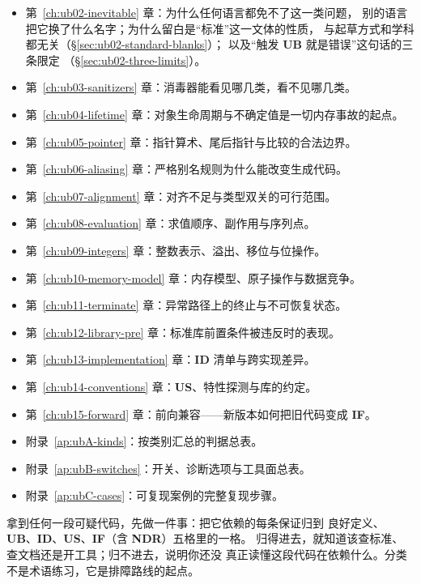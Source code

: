 \documentclass[12pt,a4paper,fontset=fandol]{ctexbook}
\newcommand{\UB}{\textbf{\textsf{UB}}}
\newcommand{\IDB}{\textbf{\textsf{ID}}}
\newcommand{\USB}{\textbf{\textsf{US}}}
\newcommand{\NDR}{\textbf{\textsf{NDR}}}
\newcommand{\ILLF}{\textbf{\textsf{IF}}}
\begin{document}
\begin{itemize}
  \item 第~\ref{ch:ub02-inevitable} 章：为什么任何语言都免不了这一类问题，
        别的语言把它换了什么名字；为什么留白是“标准”这一文体的性质，
        与起草方式和学科都无关（\S\ref{sec:ub02-standard-blanks}）；
        以及“触发 \UB{} 就是错误”这句话的三条限定
        （\S\ref{sec:ub02-three-limits}）。
  \item 第~\ref{ch:ub03-sanitizers} 章：消毒器能看见哪几类，看不见哪几类。
  \item 第~\ref{ch:ub04-lifetime} 章：对象生命周期与不确定值是一切内存事故的起点。
  \item 第~\ref{ch:ub05-pointer} 章：指针算术、尾后指针与比较的合法边界。
  \item 第~\ref{ch:ub06-aliasing} 章：严格别名规则为什么能改变生成代码。
  \item 第~\ref{ch:ub07-alignment} 章：对齐不足与类型双关的可行范围。
  \item 第~\ref{ch:ub08-evaluation} 章：求值顺序、副作用与序列点。
  \item 第~\ref{ch:ub09-integers} 章：整数表示、溢出、移位与位操作。
  \item 第~\ref{ch:ub10-memory-model} 章：内存模型、原子操作与数据竞争。
  \item 第~\ref{ch:ub11-terminate} 章：异常路径上的终止与不可恢复状态。
  \item 第~\ref{ch:ub12-library-pre} 章：标准库前置条件被违反时的表现。
  \item 第~\ref{ch:ub13-implementation} 章：\IDB{} 清单与跨实现差异。
  \item 第~\ref{ch:ub14-conventions} 章：\USB{}、特性探测与库的约定。
  \item 第~\ref{ch:ub15-forward} 章：前向兼容——新版本如何把旧代码变成 \ILLF{}。
  \item 附录~\ref{ap:ubA-kinds}：按类别汇总的判据总表。
  \item 附录~\ref{ap:ubB-switches}：开关、诊断选项与工具面总表。
  \item 附录~\ref{ap:ubC-cases}：可复现案例的完整复现步骤。
\end{itemize}

\begin{guideline}[title={读完全册应该建立的一个习惯}]
拿到任何一段可疑代码，先做一件事：把它依赖的每条保证归到
良好定义、\UB{}、\IDB{}、\USB{}、\ILLF{}（含 \NDR{}）五格里的一格。
归得进去，就知道该查标准、查文档还是开工具；归不进去，说明你还没
真正读懂这段代码在依赖什么。分类不是术语练习，它是排障路线的起点。
\end{guideline}
\end{document}

